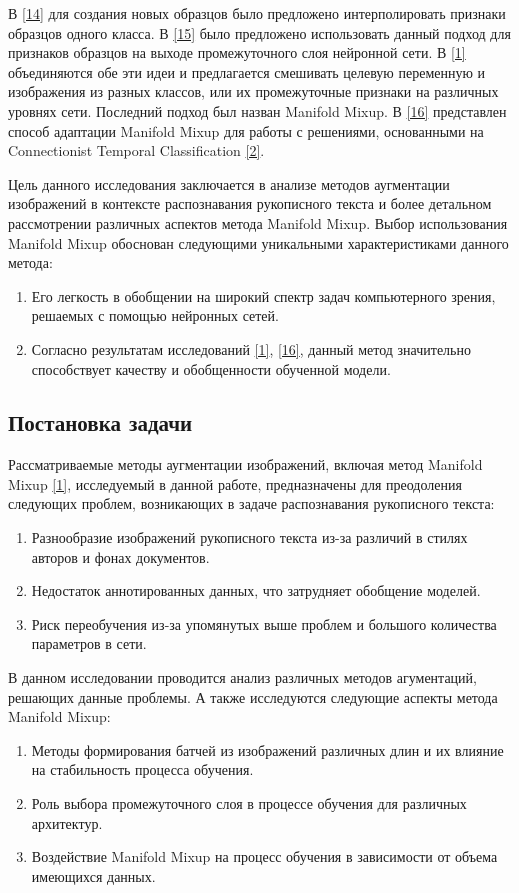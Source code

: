В \hyperlink{cite.Cha11}{[14]} для создания новых образцов было предложено интерполировать признаки образцов одного класса. В \hyperlink{cite.Dev17}{[15]} было предложено использовать данный подход для признаков образцов на выходе промежуточного слоя нейронной сети. В \hyperlink{cite.Ver18}{[1]} объединяются обе эти идеи и предлагается смешивать целевую переменную и изображения из разных классов, или их промежуточные признаки на различных уровнях сети. Последний подход был назван Manifold Mixup. В \hyperlink{cite.Bas19}{[16]} представлен способ адаптации Manifold Mixup для работы с решениями, основанными на Connectionist Temporal Classification \hyperlink{cite.Gra06}{[2]}.

Цель данного исследования заключается в анализе методов аугментации изображений в контексте распознавания рукописного текста и более детальном рассмотрении различных аспектов метода Manifold Mixup. Выбор использования Manifold Mixup обоснован следующими уникальными характеристиками данного метода:
\begin{enumerate}
\item Его легкость в обобщении на широкий спектр задач компьютерного зрения, решаемых с помощью нейронных сетей.
\item Согласно результатам исследований \hyperlink{cite.Ver18}{[1]}, \hyperlink{cite.Bas19}{[16]}, данный метод значительно способствует качеству и обобщенности обученной модели.
\end{enumerate}
 
\subsection{Постановка задачи}
Рассматриваемые методы аугментации изображений, включая метод Manifold Mixup \hyperlink{cite.Ver18}{[1]}, исследуемый в данной работе, предназначены для преодоления следующих проблем, возникающих в задаче распознавания рукописного текста:
\begin{enumerate}
\item Разнообразие изображений рукописного текста из-за различий в стилях авторов и фонах документов.
\item Недостаток аннотированных данных, что затрудняет обобщение моделей.
\item Риск переобучения из-за упомянутых выше проблем и большого количества параметров в сети.
\end{enumerate}
В данном исследовании проводится анализ различных методов агументаций, решающих данные проблемы. А также исследуются следующие аспекты метода Manifold Mixup:
\begin{enumerate}
\item Методы формирования батчей из изображений различных длин и их влияние на стабильность процесса обучения.
\item Роль выбора промежуточного слоя в процессе обучения для различных архитектур.
\item Воздействие Manifold Mixup на процесс обучения в зависимости от объема имеющихся данных.
\end{enumerate}

